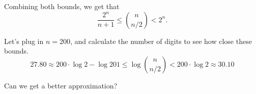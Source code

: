 \begin{frame}
  Combining both bounds, we get that
  \[\frac{2^n}{n+1}\leq \binom{n}{n/2} < 2^n.\]

  \pause Let's plug in $n=200$, and calculate the number of digits to
  see how close these bounds.
  \[27.80 \approx 200\cdot\log 2 - \log 201 \leq \log\binom{n}{n/2} < 200\cdot \log 2\approx 30.10\]
  \pause

  Can we get a better approximation?
\end{frame}
